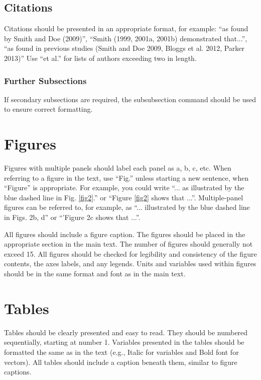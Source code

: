 \subsection{Citations}
Citations should be presented in an appropriate format, for example: ``as found by Smith and Doe (2009)'', ``Smith (1999, 2001a, 2001b) demonstrated that...'', ``as found in previous studies (Smith and Doe 2009, Bloggs et al. 2012, Parker 2013)'' Use ``et al.'' for lists of authors exceeding two in length.

\subsubsection{Further Subsections}
If secondary subsections are required, the subsubsection command should be used to ensure correct formatting.

\section{Figures}

Figures with multiple panels should label each panel as a, b, c, etc. When referring to a figure in the text, use ``Fig.'' unless starting a new sentence, when ``Figure'' is appropriate. For example, you could write ``... as illustrated by the blue dashed line in Fig. \ref{fig2}.'' or ``Figure \ref{fig2} shows that ...''. Multiple-panel figures can be referred to, for example, as ``... illustrated by the blue dashed line in Figs. 2b, d'' or ``'Figure 2c shows that ...''.

All figures should include a figure caption. The figures should be placed in the appropriate section in the main text. The number of figures should generally not exceed 15. All figures should be checked for legibility and consistency of the figure contents, the axes labels, and any legends. Units and variables used within figures should be in the same format and font as in the main text.

\section{Tables}
Tables should be clearly presented and easy to read. They should be numbered sequentially, starting at number 1. Variables presented in the tables should be formatted the same as in the text (e.g., Italic for variables and Bold font for vectors). All tables should include a caption beneath them, similar to figure captions.

